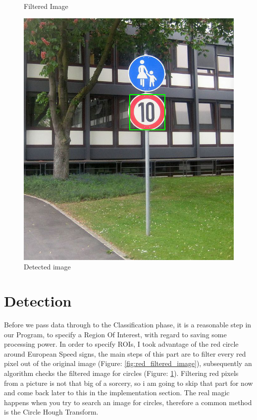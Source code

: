 \begin{figure}[H]
	\caption{Filtered Image}\label{fig:red_filtered_image}
	\endminipage\hfill
	\includegraphics[width=\linewidth]{images/detectedimg.png}
	\caption{Detected image}\label{fig:detected_image}
	\endminipage
\end{figure}

\section{Detection}
Before we pass data through to the Classification phase, it is a reasonable step in our Program, to specify a Region Of Interest, with regard to saving some processing power. In order to specify ROIs, I took advantage of the red circle around European Speed signs, the main steps of this part are to filter every red pixel out of the original image (Figure: \ref{fig:red_filtered_image}), subsequently an algorithm checks the filtered image for circles (Figure: \ref{fig:detected_image}). Filtering red pixels from a picture is not that big of a sorcery, so i am going to skip that part for now and come back later to this in the implementation section. The real magic happens when you try to search an image for circles, therefore a common method is the Circle Hough Transform. 

